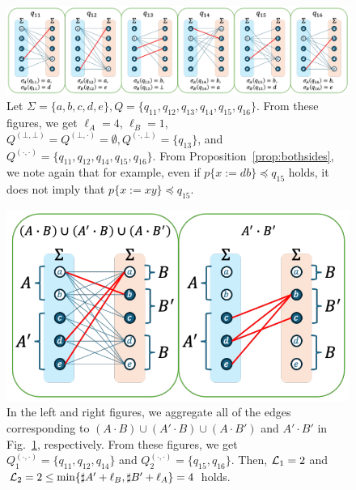 \documentclass[a4paper]{article}
\begin{document}

\newpage

\begin{figure}[t]
  \begin{center}
    \includegraphics[scale=0.54]{figs/lem11-prop4-eachreg3.pdf}
    \caption{Let $\Sigma=\{a,b,c,d,e\}, Q=\{q_{11},q_{12},q_{13},q_{14},q_{15},q_{16}\}$. From these figures, we get $\ell_A=4$, $\ell_B=1$, $Q^{(\bot,\bot)}=Q^{(\bot,\cdot)}=\emptyset, Q^{(\cdot,\bot)}=\{q_{13}\}$, and $Q^{(\cdot,\cdot)}=\{q_{11},q_{12},q_{14},q_{15},q_{16}\}$. From Proposition~\ref{prop:bothsides}, we note again that for example, even if $p \{ x:=db \} \preceq q_{15}$ holds, it does not imply that $p \{ x:=xy \} \preceq q_{15}$.}\label{fig:lem11-prop4-eachreg2}
  \end{center}
\end{figure}

\begin{figure}[t]
  \begin{center}
    \includegraphics[scale=0.525]{figs/lem11-prop4-totalreg3.pdf}
    \caption{In the left and right figures, we aggregate all of the edges corresponding to $(A\cdot B)\cup (A'\cdot B)\cup (A\cdot B')$ and $A'\cdot B'$ in Fig.~\ref{fig:lem11-prop4-eachreg2}, respectively. From these figures, we get $Q_{1}^{(\cdot,\cdot)}=\{q_{11},q_{12},q_{14}\}$ and $Q_{2}^{(\cdot,\cdot)}=\{q_{15},q_{16}\}$. Then, ${\cal L}_{1} = 2$ and ${\cal L}_{2} = 2 \leq \min\{\sharp A' + \ell_B, \sharp B' + \ell_A\} = 4$ holds.}\label{fig:lem11-prop4-totalreg2}
  \end{center}
\end{figure}

\end{document}
